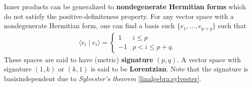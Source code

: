    \begin{remark}\label{linalgebra:NDH_form}
        Inner products can be generalized to \textbf{nondegenerate Hermitian forms} which do not satisfy the positive-definiteness property. For any vector space with a nondegenerate Hermitian form, one can find a basis such $\{e_1,\ldots,e_{p+q}\}$ such that
        \begin{gather}
            \langle e_i\mid e_i \rangle=
            \begin{cases}
                1&i\leq p\\
                -1&p<i\leq p+q.
            \end{cases}
        \end{gather}
        These spaces are said to have (metric) \textbf{signature} $(p,q)$. A vector space with signature $(1,k)$ or $(k,1)$ is said to be \textbf{Lorentzian}. Note that the signature is basisindependent due to \textit{Sylvester's theorem} \ref{linalgebra:sylvester}.
    \end{remark}

